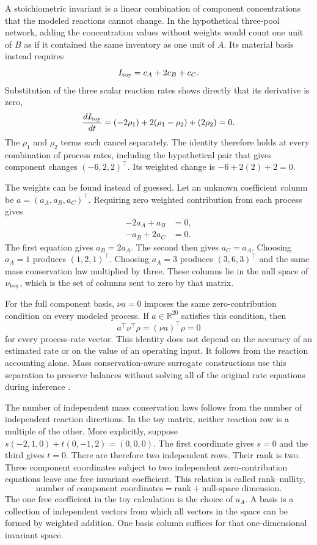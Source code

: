 A stoichiometric invariant is a linear combination of component concentrations that the modeled reactions cannot change. In the hypothetical three-pool network, adding the concentration values without weights would count one unit of $B$ as if it contained the same inventory as one unit of $A$. Its material basis instead requires
\[
I_{\rm toy}=c_A+2c_B+c_C.
\]
Substitution of the three scalar reaction rates shows directly that its derivative is zero,
\[
\frac{d I_{\rm toy}}{dt}
=(-2\rho_1)+2(\rho_1-\rho_2)+(2\rho_2)=0.
\]
The $\rho_1$ and $\rho_2$ terms each cancel separately. The identity therefore holds at every combination of process rates, including the hypothetical pair that gives component changes $(-6,2,2)^\top$. Its weighted change is $-6+2(2)+2=0$.

The weights can be found instead of guessed. Let an unknown coefficient column be $a=(a_A,a_B,a_C)^\top$. Requiring zero weighted contribution from each process gives
\[
\begin{aligned}
-2a_A+a_B&=0,\\
-a_B+2a_C&=0.
\end{aligned}
\]
The first equation gives $a_B=2a_A$. The second then gives $a_C=a_A$. Choosing $a_A=1$ produces $(1,2,1)^\top$. Choosing $a_A=3$ produces $(3,6,3)^\top$ and the same mass conservation law multiplied by three. These columns lie in the null space of $\nu_{\rm toy}$, which is the set of columns sent to zero by that matrix.

For the full component basis, $\nu a=0$ imposes the same zero-contribution condition on every modeled process. If $a\in\mathbb{R}^{20}$ satisfies this condition, then
\begin{equation}
a^\top\nu^\top\rho=(\nu a)^\top\rho=0
\label{eq:individual_invariant}
\end{equation}
for every process-rate vector. This identity does not depend on the accuracy of an estimated rate or on the value of an operating input. It follows from the reaction accounting alone. Mass conservation-aware surrogate constructions use this separation to preserve balances without solving all of the original rate equations during inference \citep{SturmWexler2020,SturmWexler2022,Hansen2024}.

The number of independent mass conservation laws follows from the number of independent reaction directions. In the toy matrix, neither reaction row is a multiple of the other. More explicitly, suppose $s(-2,1,0)+t(0,-1,2)=(0,0,0)$. The first coordinate gives $s=0$ and the third gives $t=0$. There are therefore two independent rows. Their rank is two. Three component coordinates subject to two independent zero-contribution equations leave one free invariant coefficient. This relation is called rank--nullity,
\[
\text{number of component coordinates}
=\text{rank}+\text{null-space dimension}.
\]
The one free coefficient in the toy calculation is the choice of $a_A$. A basis is a collection of independent vectors from which all vectors in the space can be formed by weighted addition. One basis column suffices for that one-dimensional invariant space.

